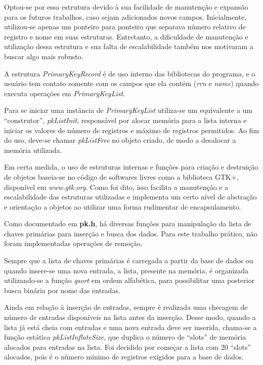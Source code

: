 \documentclass{article}
\begin{document}
Optou-se por essa estrutura devido à sua facilidade de manutenção e expansão para os futuros trabalhos, caso sejam adicionados novos campos. Inicialmente, utilizou-se apenas um ponteiro para ponteiro que separava número relativo de registro e nome em suas estruturas. Entretanto, a dificuldade de manutenção e utilização dessa estrutura e sua falta de escalabilidade também nos motivaram a buscar algo mais robusto.

A estrutura \textit{PrimaryKeyRecord} é de uso interno das bibliotecas do programa, e o usuário tem contato somente com os campos que ela contém (\textit{rrn} e \textit{name}) quando executa operações em \textit{PrimaryKeyList}.

Para se iniciar uma instância de \textit{PrimaryKeyList} utiliza-se um equivalente a um ``construtor'', \textit{pkListInit}, responsável por alocar memória para a lista interna e iniciar os valores de número de registros e máximo de registros permitidos. Ao fim do uso, deve-se chamar \textit{pkListFree} no objeto criado, de modo a desalocar a memória utilizada.

Em certa medida, o uso de estruturas internas e funções para criação e destruição de objetos baseia-se no código de softwares livres como a biblioteca GTK+, disponível em \textit{www.gtk.org}. Como foi dito, isso facilita a manutenção e a escalabilidade das estruturas utilizadas e implementa um certo nível de abstração e orientação a objetos ao utilizar uma forma rudimentar de encapsulamento.

Como documentado em \textbf{pk.h}, há diversas funções para manipulação da lista de chaves primárias para inserção e busca dos dados. Para este trabalho prático, não foram implementadas operações de remoção.

Sempre que a lista de chaves primárias é carregada a partir da base de dados ou quando insere-se uma nova entrada, a lista, presente na memória, é organizada utilizando-se a função \textit{qsort} em ordem alfabética, para possibilitar uma posterior busca binária por nome das entradas.

Ainda em relação à inserção de entradas, sempre é realizada uma checagem de número de entradas disponíveis na lista antes da inserção. Desse modo, quando a lista já está cheia com entradas e uma nova entrada deve ser inserida, chama-se a função estática \textit{pkListInflateSize}, que duplica o número de ``slots'' de memória alocados para entradas na lista. Foi decidido por começar a lista com 20 ``slots'' alocados, pois é o número mínimo de registros exigidos para a base de dados.
\end{document}
